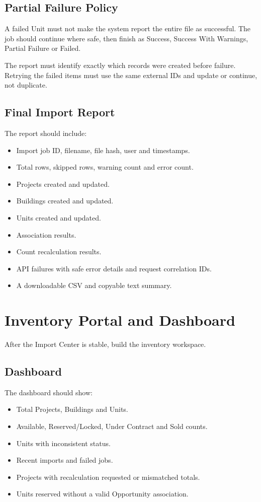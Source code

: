 \documentclass[10pt]{article}
\begin{document}
\subsection{Partial Failure Policy}
A failed Unit must not make the system report the entire file as successful. The job should continue where safe, then finish as Success, Success With Warnings, Partial Failure or Failed.

The report must identify exactly which records were created before failure. Retrying the failed items must use the same external IDs and update or continue, not duplicate.

\subsection{Final Import Report}
The report should include:
\begin{itemize}
\item Import job ID, filename, file hash, user and timestamps.
\item Total rows, skipped rows, warning count and error count.
\item Projects created and updated.
\item Buildings created and updated.
\item Units created and updated.
\item Association results.
\item Count recalculation results.
\item API failures with safe error details and request correlation IDs.
\item A downloadable CSV and copyable text summary.
\end{itemize}

\section{Inventory Portal and Dashboard}
After the Import Center is stable, build the inventory workspace.

\subsection{Dashboard}
The dashboard should show:
\begin{itemize}
\item Total Projects, Buildings and Units.
\item Available, Reserved/Locked, Under Contract and Sold counts.
\item Units with inconsistent status.
\item Recent imports and failed jobs.
\item Projects with recalculation requested or mismatched totals.
\item Units reserved without a valid Opportunity association.
\end{itemize}
\end{document}
